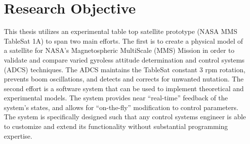 











\section{Research Objective}
\label{sec:ResearchObjective}

This thesis utilizes an experimental table top satellite prototype (NASA MMS TableSat 1A) to span two main efforts.  The first is to create a physical model of a satellite for NASA's Magnetospheric MultiScale (MMS) Mission in order to validate and compare varied gyroless attitude determination and control systems (ADCS) techniques.  The ADCS maintains the TableSat constant 3 rpm rotation, prevents boom oscillations, and detects and corrects for unwanted nutation.  The second effort is a software system that can be used to implement theoretical and experimental models.  The system provides near ``real-time'' feedback of the system's states, and allows for ``on-the-fly'' modification to control parameters.  The system is specifically designed such that any control systems engineer is able to customize and extend its functionality without substantial programming expertise.

